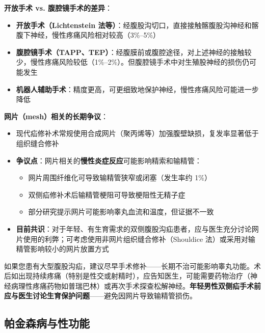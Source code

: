 \begin{enumerate}
\vspace{0.5em}
\noindent\textbf{开放手术 vs. 腹腔镜手术的差异}：

\begin{itemize}[leftmargin=2cm]
	\item \textbf{开放手术（Lichtenstein 法等）}：经腹股沟切口，直接接触髂腹股沟神经和髂腹下神经，慢性疼痛风险相对较高（3\%--5\%）
	\item \textbf{腹腔镜手术（TAPP、TEP）}：经腹膜前或腹腔途径，对上述神经的接触较少，慢性疼痛风险较低（1\%--2\%）。但腹腔镜手术中对生殖股神经的损伤仍可能发生
	\item \textbf{机器人辅助手术}：精度更高，可更细致地保护神经，慢性疼痛风险可能进一步降低
\end{itemize}

\vspace{0.5em}
\noindent\textbf{网片（mesh）相关的长期争议}：

\begin{itemize}[leftmargin=2cm]
	\item 现代疝修补术常规使用合成网片（聚丙烯等）加强腹壁缺损，复发率显著低于组织缝合修补
	\item \textbf{争议点}：网片相关的\textbf{慢性炎症反应}可能影响精索和输精管：
	\begin{itemize}
		\item 网片周围纤维化可导致输精管狭窄或闭塞（发生率约 1\%）
		\item 双侧疝修补术后输精管梗阻可导致梗阻性无精子症
		\item 部分研究提示网片可能影响睾丸血流和温度，但证据不一致
	\end{itemize}
	\item \textbf{目前共识}：对于年轻、有生育需求的双侧腹股沟疝患者，应与医生充分讨论网片使用的利弊；可考虑使用非网片组织缝合修补（Shouldice 法）或采用对输精管影响较小的网片放置方式
\end{itemize}

\begin{tcolorbox}[colback=pink!5!white,colframe=red!50!black,title=贴心小叮咛]
如果您患有大型腹股沟疝，建议尽早手术修补——长期不治可能影响睾丸功能。术后如出现持续疼痛（特别是性交或射精时），应告知医生，可能需要药物治疗（神经病理性疼痛药物如普瑞巴林）或再次手术探查松解神经。\textbf{年轻男性双侧疝手术前应与医生讨论生育保护问题}——避免因网片导致输精管损伤。
\end{tcolorbox}

\subsection{帕金森病与性功能}
\label{subsec:parkinson_sex}


\end{enumerate}
